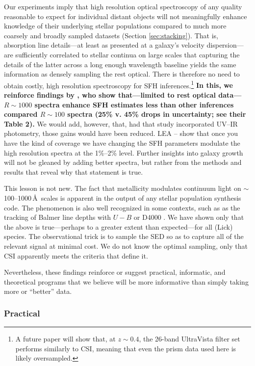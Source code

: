 \documentclass[a4paper,fleqn,usenatbib]{mnras}
\newcommand{\bfr}{\bf\color{red}}
\newcommand{\bfb}{\color{myblue}}
\begin{document}
Our experiments imply that high resolution optical spectroscopy of any quality reasonable
to expect for individual distant objects will not meaningfully 
enhance knowledge of their underlying stellar populations compared to much more coarsely and broadly 
sampled datasets (Section \ref{sec:stacking}). That is, absorption line 
details---at least as presented at a galaxy's velocity dispersion---are sufficiently correlated to 
stellar continua on large scales that capturing the details 
of the latter across a long enough wavelength baseline yields the same information as 
densely sampling the rest optical. There is therefore no need to obtain 
costly, high resolution spectroscopy for SFH inferences.\footnote{A future 
paper will show that, at $z\sim0.4$, the 26-band UltraVista filter set \citep{Muzzin13} performs 
similarly to CSI, meaning that even the prism data used here is likely oversampled.}
{\bfr In this, we reinforce findings by \citet{Pacifici12}, who show that---limited to 
rest optical data---$R\sim1000$ spectra enhance SFH estimates less than other inferences 
compared $R\sim100$ spectra (25\% v. 45\% drops in uncertainty; see their Table 2).} 
We would add, however, that, had that study incorporated UV--IR photometry, 
those gains would have been reduced. {\bfb LEA -- \citep{Leja19, Lower20} show that once you have
the kind of coverage we have changing the SFH parameters modulate the high resolution
spectra at the 1\%--2\% level.}
Further insights into galaxy growth will not be gleaned by adding better spectra, but rather
from the methods and results that reveal why that statement is true.

This lesson is not new. The fact that 
metallicity modulates continuum light on $\sim$100--1000\,\AA\ scales is apparent in the
output of any stellar population synthesis code. The phenomenon is also well recognized in 
some contexts, such as as the tracking of Balmer line depths with $U-B$ or D4000 
\citep[e.g.,][]{Kauffmann03,CidFernandes05}. We have shown only that the above is true---perhaps
to a greater extent than expected---for all (Lick) species. The observational trick is to sample the 
SED so as to capture all of the relevant signal at minimal cost. We do not know the optimal sampling,
 only that CSI apparently meets the criteria that define it.

Nevertheless, these findings reinforce or suggest practical, informatic, and 
theoretical programs that we believe will be more informative than simply taking more or
``better'' data.

\subsubsection{Practical}
\end{document}
